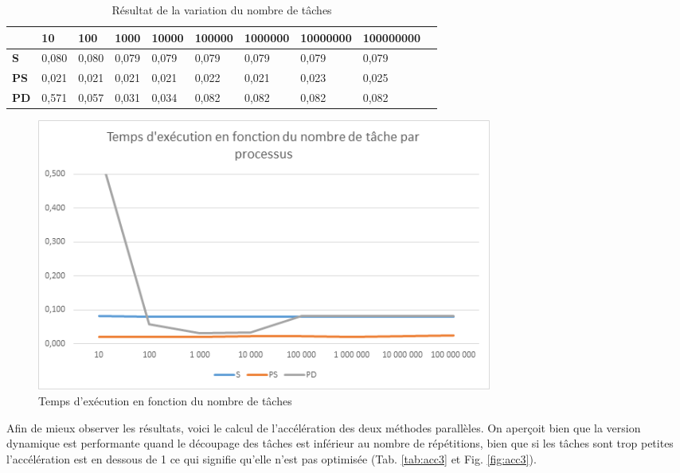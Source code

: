 \documentclass[a4paper,12pt]{article}
\begin{document}
\begin{table}[H]
\caption{Résultat de la variation du nombre de tâches}
\label{tab:tempsexec3}
\begin{tabular}{|l|l|l|l|l|l|l|l|l|l|}
\hline
            & \textbf{10} & \textbf{100} & \textbf{1000} & \textbf{10000} & \textbf{100000} & \textbf{1000000} & \textbf{10000000} & \textbf{100000000} \\ \hline
\textbf{S}  & 0,080        & 0,080        & 0,079       	 & 0,079         & 0,079          & 0,079           & 0,079            & 0,079             \\ \hline
\textbf{PS} & 0,021       & 0,021        & 0,021         & 0,021          & 0,022           & 0,021            & 0,023             & 0,025              \\ \hline
\textbf{PD} & 0,571       & 0,057        & 0,031         & 0,034          & 0,082           & 0,082 & 0,082 & 0,082              \\ \hline

\end{tabular}
\end{table}

\begin{figure}[H]
\center \includegraphics[width=15cm]{exec3}
\caption{Temps d'exécution en fonction du nombre de tâches}
\label{fig:tempsexec3}
\end{figure}

Afin de mieux observer les résultats, voici le calcul de l'accélération des deux méthodes parallèles. On aperçoit bien que la version dynamique est performante quand le découpage des tâches est inférieur au nombre de répétitions, bien que si les tâches sont trop petites l'accélération est en dessous de 1 ce qui signifie qu'elle n'est pas optimisée (Tab. \ref{tab:acc3} et Fig. \ref{fig:acc3}). 
\end{document}
